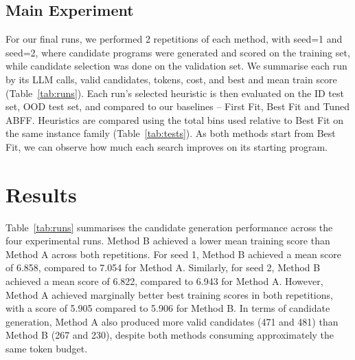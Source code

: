\documentclass[12pt]{article}
\begin{document}
\subsection{Main Experiment}
For our final runs, we performed 2 repetitions of each method, with seed=1 and seed=2, where candidate programs were generated and scored on the training set, while candidate selection was done on the validation set. We summarise each run by its LLM calls, valid candidates, tokens, cost, and best and mean train score (Table~\ref{tab:runs}). Each run's selected heuristic is then evaluated on the ID test set, OOD test set, and compared to our baselines -- First Fit, Best Fit and Tuned ABFF. Heuristics are compared using the total bins used relative to Best Fit on the same instance family (Table~\ref{tab:tests}). As both methods start from Best Fit, we can observe how much each search improves on its starting program.

\section{Results}
Table~\ref{tab:runs} summarises the candidate generation performance across the four experimental runs. Method B achieved a lower mean training score than Method A across both repetitions. For seed 1, Method B achieved a mean score of 6.858, compared to 7.054 for Method A. Similarly, for seed 2, Method B achieved a mean score of 6.822, compared to 6.943 for Method A.
However, Method A achieved marginally better best training scores in both repetitions, with a score of 5.905 compared to 5.906 for Method B. In terms of candidate generation, Method A also produced more valid candidates (471 and 481) than Method B (267 and 230), despite both methods consuming approximately the same token budget.

\begin{table}[htbp]\centering\scriptsize\caption{Score and cost per experimental run}\label{tab:runs}
\end{table}
\end{document}
